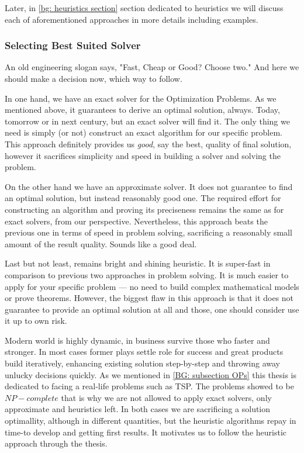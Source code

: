 Later, in \ref{bg: heuristics section} section dedicated to heuristics we will discuss each of aforementioned approaches in more details including examples.


\subsubsection{Selecting Best Suited Solver}
An old engineering slogan says, "Fast, Cheap or Good? Choose two."
And here we should make a decision now, which way to follow.

In one hand, we have an exact solver for the Optimization Problems. As we mentioned above, it guarantees to derive an optimal solution, always. Today, tomorrow or in next century, but an exact solver will find it. The only thing we need is simply (or not) construct an exact algorithm for our specific problem. This approach definitely provides us \textit{good}, say the best, quality of final solution, however it sacrifices simplicity and speed in building a solver and solving the problem.


On the other hand we have an approximate solver. It does not guarantee to find an optimal solution, but instead reasonably good one. The required effort for constructing an algorithm and proving its preciseness remains the same as for exact solvers, from our perspective. Nevertheless, this approach beats the previous one in terms of speed in problem solving, sacrificing a reasonably small amount of the result quality. Sounds like a good deal.


Last but not least, remains bright and shining heuristic. It is super-fast in comparison to previous two approaches in problem solving. It is much easier to apply for your specific problem — no need to build complex mathematical models or prove theorems. However, the biggest flaw in this approach is that it does not guarantee to provide an optimal solution at all and those, one should consider use it up to own risk.


Modern world is highly dynamic, in business survive those who faster and stronger. In most cases former plays settle role for success and great products build iteratively, enhancing existing solution step-by-step and throwing away unlucky decisions quickly. As we mentioned in \ref{BG: subsection OPs} this thesis is dedicated to facing a real-life problems such as TSP. The problems showed to be $NP-complete$ that is why we are not allowed to apply exact solvers, only approximate and heuristics left. In both cases we are sacrificing a solution optimallity, although in different quantities, but the heuristic algorithms repay in time-to develop and getting first results. It motivates us to follow the heuristic approach through the thesis.

